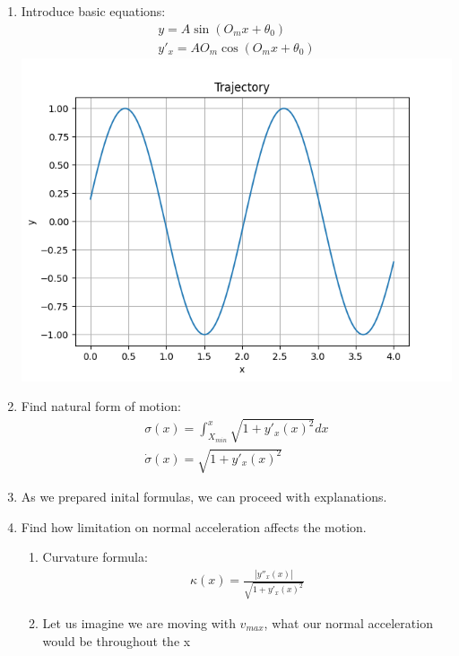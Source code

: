 \documentclass{article}
\begin{document}
\begin{enumerate}
      \item Introduce basic equations:
            \begin{align}
                  y = A \sin(O_m x + \theta_0) \\
                  y'_x = A O_m \cos(O_m x + \theta_0)
            \end{align}
            \includegraphics[width=\linewidth]{trajectory.png}
      \item Find natural form of motion:
            \begin{align}
                  \sigma(x) = \int_{X_{min}}^{x} \sqrt{1 + {y'_{x}(x)}^2} dx \\
                  \dot{\sigma}(x) = \sqrt{1 + {y'_{x}(x)}^2}
            \end{align}
      \item As we prepared inital formulas, we can proceed with explanations.
      \item Find how limitation on normal acceleration affects the motion.
            \begin{enumerate}
                  \item Curvature formula:
                        \begin{align}
                              \kappa(x) = \frac{|y''_x(x)|}{\sqrt{1 + {y'_{x}(x)}^2}}
                        \end{align}
                  \item Let us imagine we are moving with $v_{max}$, what our normal acceleration would be throughout the x
                        \begin{align}

\end{align}
\end{enumerate}
\end{enumerate}
\end{document}
